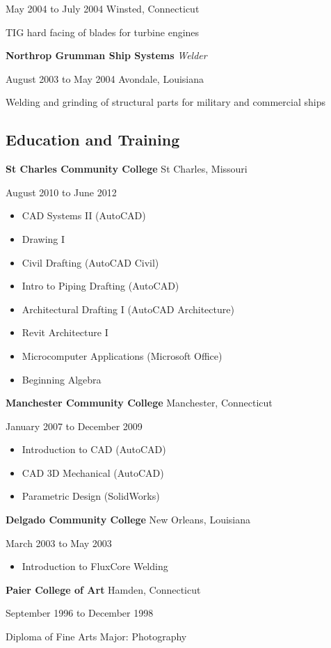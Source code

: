 \documentclass[9pt]{extarticle}
\begin{document}
May 2004 to July 2004 \hfill Winsted, Connecticut

\hfill

TIG hard facing of blades for turbine engines

\hfill

\textbf{Northrop Grumman Ship Systems} \hfill \textit{Welder}

August 2003 to May 2004 \hfill Avondale, Louisiana

\hfill

Welding and grinding of structural parts for military and commercial ships


\subsection*{Education and Training}
\textbf{St Charles Community College} \hfill St Charles, Missouri

August 2010 to June 2012
\begin{itemize}
    \item CAD Systems II (AutoCAD) 
    \item Drawing I 
    \item Civil Drafting (AutoCAD Civil)
    \item Intro to Piping Drafting (AutoCAD) 
    \item Architectural Drafting I (AutoCAD Architecture)
    \item Revit Architecture I 
    \item Microcomputer Applications (Microsoft Office)
    \item Beginning Algebra
\end{itemize}

\hfill

\textbf{Manchester Community College} \hfill Manchester, Connecticut

January 2007 to December 2009

\begin{itemize}
    \item Introduction to CAD (AutoCAD) 
    \item CAD 3D Mechanical (AutoCAD)
    \item Parametric Design (SolidWorks)
    \end{itemize}

\hfill

\textbf{Delgado Community College} \hfill New Orleans, Louisiana

March 2003 to May 2003
\begin{itemize}
    \item Introduction to Flux­Core Welding
\end{itemize}
\hfill

\textbf{Paier College of Art}  \hfill Hamden, Connecticut

September 1996 to December 1998  

Diploma of Fine Arts \hfill Major: Photography
\end{document}
